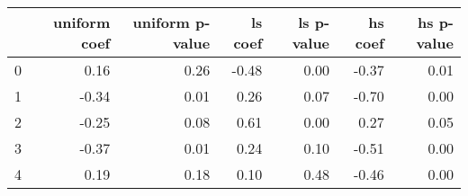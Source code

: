 \begin{tabular}{lrrrrrr}
\toprule
 & uniform coef & uniform p-value & ls coef & ls p-value & hs coef & hs p-value \\
\midrule
0 & 0.16 & 0.26 & -0.48 & 0.00 & -0.37 & 0.01 \\
1 & -0.34 & 0.01 & 0.26 & 0.07 & -0.70 & 0.00 \\
2 & -0.25 & 0.08 & 0.61 & 0.00 & 0.27 & 0.05 \\
3 & -0.37 & 0.01 & 0.24 & 0.10 & -0.51 & 0.00 \\
4 & 0.19 & 0.18 & 0.10 & 0.48 & -0.46 & 0.00 \\
\bottomrule
\end{tabular}

